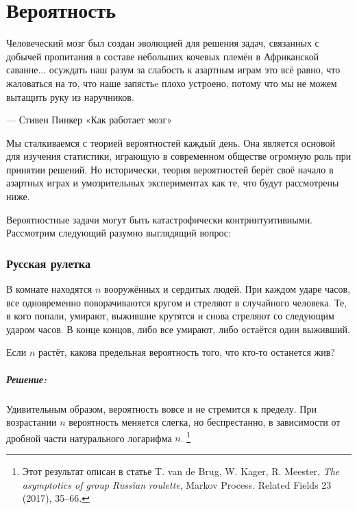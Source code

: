 \chapter*{Вероятность}

\setlength{\epigraphwidth}{.85\textwidth}
\epigraph{Человеческий мозг был создан эволюцией для решения задач, связанных с добычей пропитания в составе небольших кочевых племён в Африканской саванне...
осуждать наш разум за слабость к азартным играм это всё равно, что жаловаться на то, что наше запястьe плохо устроено, потому что мы не можем вытащить руку из наручников.}{--- Стивен Пинкер «Как работает мозг»%
}

Мы сталкиваемся с теорией вероятностей каждый день.
Она является основой для изучения статистики, играющую в современном обществе огромную роль при принятии решений.
Но исторически, теория вероятностей берёт своё начало в азартных играх и умозрительных экспериментах как те, что будут рассмотрены ниже.

\medskip

Вероятностные задачи могут быть катастрофически контринтуитивными.
Рассмотрим следующий разумно выглядящий вопрос:

\subsection*{Русская рулетка} %

В комнате находятся $n$ вооружённых и сердитых людей.
При каждом ударе часов, все одновременно поворачиваются кругом и стреляют в случайного человека.
Те, в кого попали, умирают, выжившие крутятся и снова стреляют со следующим ударом часов.
В конце концов, либо все умирают, либо остаётся один выживший.

Если $n$ растёт, какова предельная вероятность того, что кто-то останется жив?

\paragraph{Решение:} Удивительным образом, вероятность вовсе и не стремится к пределу.
При возрастании $n$ вероятность меняется слегка, но беспрестанно, в зависимости от дробной части натурального логарифма $n$.%
\footnote{Этот результат описан в статье 
T. van de Brug, W. Kager, R. Meester, \emph{The asymptotics of group Russian roulette},
Markov Process. Related Fields 23 (2017), 35--66.}

